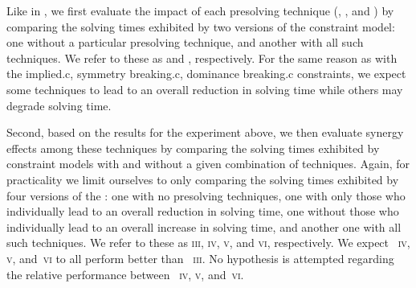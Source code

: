 Like in , we first evaluate the impact of each
\gls{presolving} technique (,
,
and ) by comparing the solving times
exhibited by two versions of the \gls{constraint model}: one without a
particular \gls{presolving} technique, and another with all such techniques.
%
We refer to these  as \modelA{} and \modelB,
respectively.
%
For the same reason as with the \gls{implied.c}, \gls{symmetry breaking.c},
\gls{dominance breaking.c} \glspl{constraint}, we expect some techniques to lead
to an overall reduction in solving time while others may degrade solving time.

\def\modelC{\textsc{iii}}
\def\modelD{\textsc{iv}}
\def\modelE{\textsc{v}}
\def\modelF{\textsc{vi}}

Second, based on the results for the experiment above, we then evaluate synergy
effects among these techniques by comparing the solving times exhibited by
\glspl{constraint model} with and without a given combination of techniques.
%
Again, for practicality we limit ourselves to only comparing the solving times
exhibited by four versions of the : one with no
\gls{presolving} techniques, one with only those who individually lead to an
overall reduction in solving time, one without those who individually lead to an
overall increase in solving time, and another one with all such techniques.
%
We refer to these  as \modelC, \modelD, \modelE,
and \modelF, respectively.
%
We expect ~\modelD, \modelE, and~\modelF{} to all
perform better than ~\modelC.
%
No hypothesis is attempted regarding the relative performance between
~\modelD, \modelE, and~\modelF.


